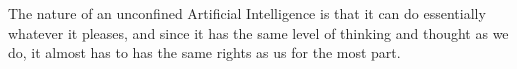 The nature of an unconfined Artificial Intelligence is that it can do essentially whatever it pleases, and since it has the same level of thinking and thought as we do, it almost has to has the same rights as us for the most part.